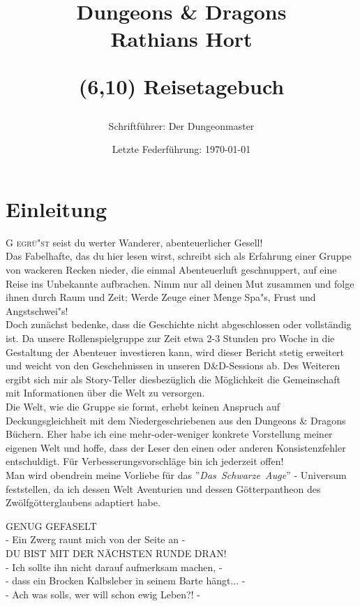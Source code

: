 \documentclass[11pt, openany]{article} %
\title{\fontsize{40pt}{42pt}\selectfont Dungeons \& Dragons \\
Rathians Hort
\author{Schriftf\"uhrer: Der Dungeonmaster}
\date{Letzte Federf\"uhrung: \today}
\begin{textblock}{4}(6,10)
\Huge Reisetagebuch
\end{textblock}
}
\begin{document}
\maketitle
\newpage
\tableofcontents
\newpage

\section{Einleitung}

\lettrine{G}{ egr\"u"st} seist du werter Wanderer, abenteuerlicher Gesell!\\ Das Fabelhafte, das du hier lesen wirst, schreibt sich als Erfahrung einer Gruppe von wackeren Recken nieder, die einmal Abenteuerluft geschnuppert, auf eine Reise ins Unbekannte aufbrachen. Nimm nur all deinen Mut zusammen und folge ihnen durch Raum und Zeit; Werde Zeuge einer Menge Spa"s, Frust und Angstschwei"s!\\

Doch zun\"achst bedenke, dass die Geschichte nicht abgeschlossen oder vollst\"andig ist. Da unsere Rollenspielgruppe zur Zeit etwa 2-3 Stunden pro Woche in die Gestaltung der Abenteuer investieren kann, wird dieser Bericht stetig erweitert und weicht von den Geschehnissen in unseren D\&D-Sessions ab. Des Weiteren ergibt sich mir als Story-Teller diesbez\"uglich die M\"oglichkeit die Gemeinschaft mit Informationen \"uber die Welt zu versorgen. \\

Die Welt, wie die Gruppe sie formt, erhebt keinen Anspruch auf Deckungsgleichheit mit dem Niedergeschriebenen aus den Dungeons \& Dragons B\"uchern. Eher habe ich eine mehr-oder-weniger konkrete Vorstellung meiner eigenen Welt und hoffe, dass der Leser den einen oder anderen Konsistenzfehler entschuldigt. F\"ur Verbesserungsvorschl\"age bin ich jederzeit offen!\\

Man wird obendrein meine Vorliebe f\"ur das \mbox{''\textit{Das Schwarze Auge}''} - Universum feststellen, da ich dessen Welt Aventurien und dessen G\"otterpantheon des Zw\"olfg\"otterglaubens adaptiert habe.\\

\begin{center}
    GENUG GEFASELT\\
    - Ein Zwerg raunt mich von der Seite an -\\
    DU BIST MIT DER N\"ACHSTEN RUNDE DRAN!\\
    - Ich sollte ihn nicht darauf aufmerksam machen, -\\
    - dass ein Brocken Kalbsleber in seinem Barte h\"angt... -\\
    - Ach was solls, wer will schon ewig Leben?! -
\end{center}
\end{document}
